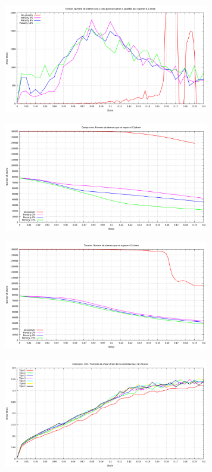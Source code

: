 \documentclass[10pt, oneside]{article} %
\begin{document}
\begin{figure}[H]
\centering
\includegraphics[width=9cm]{Figures/Porosidad/Porosidad_ss_4.png}
\caption{}
\end{figure}

\begin{figure}[H]
\centering
\includegraphics[width=9cm]{Figures/Porosidad/Porosidad_ss_5.png}
\caption{}
\end{figure}

\begin{figure}[H]
\centering
\includegraphics[width=9cm]{Figures/Porosidad/Porosidad_ss_6.png}
\caption{}
\end{figure}

\begin{figure}[H]
\centering
\includegraphics[width=9cm]{Figures/Porosidad/Porosidad_ss_7.png}
\caption{}
\end{figure}
\end{document}
